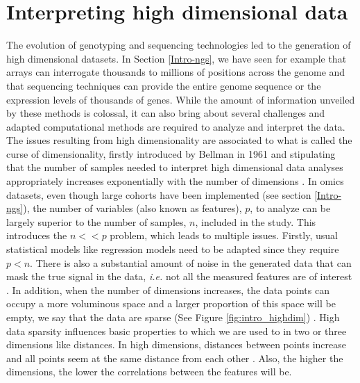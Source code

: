 


\section{Interpreting high dimensional data}
\label{Intro-method} 
The evolution of genotyping and sequencing technologies led to the generation of high dimensional datasets. In Section \ref{Intro-ngs}, we have seen for example that arrays can interrogate thousands to millions of positions across the genome and that sequencing techniques can provide the entire genome sequence or the expression levels of thousands of genes. While the amount of information unveiled by these methods is colossal, it can also bring about several challenges and adapted computational methods are required to analyze and interpret the data. The issues resulting from high dimensionality are associated to what is called the curse of dimensionality, firstly introduced by Bellman in 1961 and stipulating that the number of samples needed to interpret high dimensional data analyses appropriately increases exponentially with the number of dimensions \cite{Altman2018}.  
In omics datasets, even though large cohorts have been implemented (see section \ref{Intro-ngs}), the number of variables (also known as features), $p$, to analyze can be largely superior to the number of samples, $n$, included in the study. This introduces the $n<<p$ problem, which leads to multiple issues.
Firstly, usual statistical models like regression models need to be adapted since they require $p<n$. There is also a substantial amount of noise in the generated data that can mask the true signal in the data, \textit{i.e.} not all the measured features are of interest \cite{Domingos2012, Ronan2016}.
In addition, when the number of dimensions increases, the data points can occupy a more voluminous space and a larger proportion of this space will be empty, we say that the data are sparse (See Figure \ref{fig:intro_highdim}) \cite{Altman2018}. High data sparsity influences basic properties to which we are used to in two or three dimensions like distances. In high dimensions, distances between points increase and all points seem at the same distance from each other \cite{Ronan2016,Altman2018}. Also, the higher the dimensions, the lower the correlations between the features will be. %
